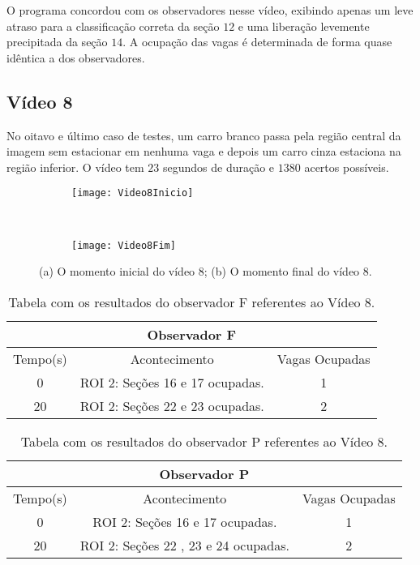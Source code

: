 O programa concordou com os observadores nesse vídeo, exibindo apenas um leve atraso para a classificação correta da seção $12$ e uma liberação levemente precipitada da seção $14$. A ocupação das vagas é determinada de forma quase idêntica a dos observadores.

\subsection{Vídeo 8}

No oitavo e último caso de testes, um carro branco passa pela região central da imagem sem estacionar em nenhuma vaga e depois um carro cinza estaciona na região inferior. O vídeo tem $23$ segundos de duração e $1380$ acertos possíveis.

\begin{figure}[H]
\centering
\begin{subfigure}{.5\textwidth}
\centering
\texttt{[image: Video8Inicio]}
\caption{}
\end{subfigure}\
\begin{subfigure}{.5\textwidth}
\centering
\texttt{[image: Video8Fim]}
\caption{}
\end{subfigure}
\centering
\caption{(a) O momento inicial do vídeo 8; (b) O momento final do vídeo 8.}%
\label{}%
\end{figure}

\begin{table}[H]
\begin{center}
\begin{tabular}{|c||c||c|}
\hline
\multicolumn{3}{|c|}{Observador F}  \\ \hline \hline
Tempo(s) & Acontecimento & Vagas Ocupadas\\ \hline
0 & ROI 2: Seções 16 e 17 ocupadas. & 1 \\ \hline
20 & ROI 2: Seções 22 e 23 ocupadas. & 2 \\
\hline
\end{tabular}
\end{center}
\caption{Tabela com os resultados do observador F referentes ao Vídeo 8.}
\label{tab:video8F}
\end{table}


\begin{table}[H]
\begin{center}
\begin{tabular}{|c||c||c|}
\hline
\multicolumn{3}{|c|}{Observador P}  \\ \hline \hline
Tempo(s) & Acontecimento & Vagas Ocupadas\\ \hline
0 & ROI 2: Seções 16 e 17 ocupadas. & 1 \\ \hline
20 & ROI 2: Seções 22 , 23 e 24 ocupadas. & 2 \\
\hline
\end{tabular}
\end{center}
\caption{Tabela com os resultados do observador P referentes ao Vídeo 8.}
\label{tab:video8P}
\end{table}


